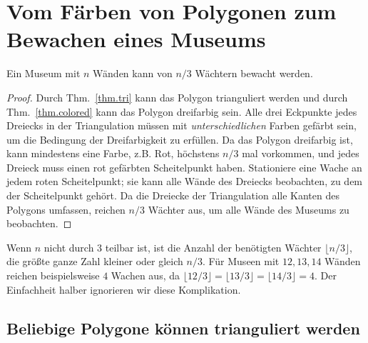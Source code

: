 \section{Vom Färben von Polygonen zum Bewachen eines Museums}\label{s.museum-guard}

\begin{theorem}\label{thm.guarded} Ein Museum mit $n$ Wänden kann von $n/3$ Wächtern bewacht werden.
\end{theorem}
\begin{proof}
Durch Thm.~\ref{thm.tri} kann das Polygon trianguliert werden und durch Thm.~\ref{thm.colored} kann das Polygon dreifarbig sein. Alle drei Eckpunkte jedes Dreiecks in der Triangulation müssen mit \emph{unterschiedlichen} Farben gefärbt sein, um die Bedingung der Dreifarbigkeit zu erfüllen. Da das Polygon dreifarbig ist, kann mindestens eine Farbe, z.B. Rot, höchstens $n/3$ mal vorkommen, und jedes Dreieck muss einen rot gefärbten Scheitelpunkt haben. Stationiere eine Wache an jedem roten Scheitelpunkt; sie kann alle Wände des Dreiecks beobachten, zu dem der Scheitelpunkt gehört. Da die Dreiecke der Triangulation alle Kanten des Polygons umfassen, reichen $n/3$ Wächter aus, um alle Wände des Museums zu beobachten.
\end{proof}
Wenn $n$ nicht durch $3$ teilbar ist, ist die Anzahl der benötigten Wächter $\lfloor n/3\rfloor$, die größte ganze Zahl kleiner oder gleich $n/3$. Für Museen mit $12, 13, 14$ Wänden reichen beispielsweise $4$ Wachen aus, da $\lfloor 12/3\rfloor =\lfloor 13/3\rfloor=\lfloor 14/3\rfloor=4$. Der Einfachheit halber ignorieren wir diese Komplikation.
 
\subsection{Beliebige Polygone können trianguliert werden}\label{s.museum-trianguliert}


